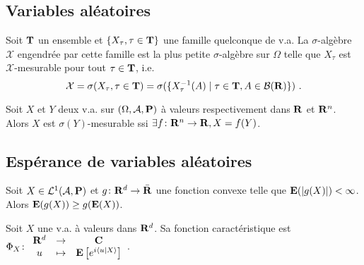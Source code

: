 \subsection{Variables aléatoires}

	\begin{defn}
		Soit $\mathbf{T}$ un ensemble et $\{ X_\tau, \tau \in \mathbf{T} \}$ une famille quelconque de v.a.
		La $\sigma$-algèbre $\mathcal{X}$ engendrée par cette famille est la plus petite $\sigma$-algèbre sur $\Omega$ telle que $X_\tau$ est $\mathcal{X}$-mesurable pour tout $\tau \in \mathbf{T}$, i.e.
		$$\mathcal{X} = \sigma(X_\tau, \tau \in \T) = \sigma(\{ X_\tau^{-1}(A) \mid \tau \in \T, A \in \mathcal{B}(\R) \})\ .$$
	\end{defn}

	\begin{lem}
		Soit $X$ et $Y$ deux v.a. sur $(\Omega,\mathcal{A},\mathbf{P})$ à valeurs respectivement dans $\mathbf{R}$ et $\mathbf{R}^n$.
		Alors $X$ est $\sigma(Y)$-mesurable ssi $\exists f \colon \mathbf{R}^n \to \mathbf{R}, X = f(Y)$.
	\end{lem}


\subsection{Espérance de variables aléatoires}


	\begin{thm}
		Soit $X \in \mathcal{L}^1(\mathcal{A},\mathbf{P})$ et $g \colon \mathbf{R}^d \to \Bar{\mathbf{R}}$ une fonction convexe telle que $\mathbf{E}(\left\lvert g(X)\right\rvert) < \infty$.
		Alors $\mathbf{E}(g(X)) \geq g(\mathbf{E}(X))$.
	\end{thm}

	\begin{defn}
		Soit $X$ une v.a. à valeurs dans $\mathbf{R}^d$.
		Sa fonction caractéristique est $\Phi_X \colon \begin{array}{ccc}
			\mathbf{R}^d & \to & \mathbf{C} \\
			u & \mapsto & \mathbf{E} \left[ e^{i \left\langle u \mid X \right\rangle} \right]
		\end{array}$.
	\end{defn}

